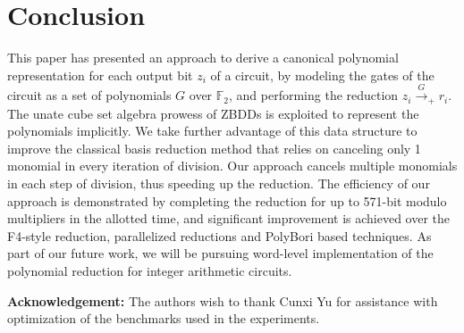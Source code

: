 \section{Conclusion}
This paper has presented an approach to derive a canonical polynomial
representation for each output bit $z_i$ of a circuit, by modeling the gates
of the circuit as a set of polynomials $G$ over $\mathbb{F}_2$, and
performing the reduction $z_i\xrightarrow{G}_+ r_i$. 
The unate cube set algebra prowess of ZBDDs is exploited to represent
the polynomials implicitly. We take further advantage of this
data structure to improve the classical \Grobner basis reduction
method that relies on canceling only 1 monomial in every iteration
of division. Our approach cancels multiple monomials in each step of
division, thus speeding up the reduction. 
The  efficiency of our approach is demonstrated by completing  the
reduction for up to 571-bit modulo multipliers in the allotted time,
and significant improvement is achieved over the F4-style reduction,
parallelized reductions and  PolyBori based techniques. As part of our future work, we will be
pursuing word-level implementation of the polynomial reduction
for integer arithmetic circuits.  
\par \textbf{Acknowledgement:} The authors wish to thank Cunxi Yu for 
assistance with optimization of the
benchmarks used in the experiments. 
% 

